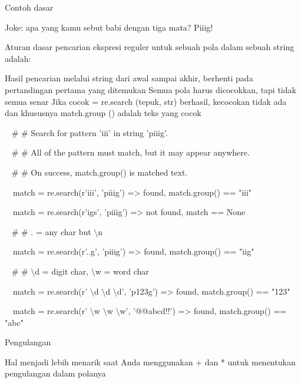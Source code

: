 \noindent 
Contoh dasar \par
\noindent 
Joke: apa yang kamu sebut babi dengan tiga mata? Piiig! \par
\vspace{12pt}
\noindent 
Aturan dasar pencarian ekspresi reguler untuk sebuah pola dalam sebuah string adalah: \par
\noindent 
Hasil pencarian melalui string dari awal sampai akhir, berhenti pada pertandingan pertama yang ditemukan  Semua pola harus dicocokkan, tapi tidak semua senar Jika cocok = re.search (tepuk, str) berhasil, kecocokan tidak ada dan khususnya match.group () adalah teks yang cocok \par
\vspace{12pt}
\noindent 
~  $  \#  $ $  \#  $ Search for pattern 'iii' in string 'piiig'. \par
\noindent 
~  $  \#  $ $  \#  $ All of the pattern must match, but it may appear anywhere. \par
\noindent 
~  $  \#  $ $  \#  $ On success, match.group() is matched text. \par
\noindent 
~~match = re.search(r'iii', 'piiig') =>  found, match.group() == "iii" \par
\noindent 
~~match = re.search(r'igs', 'piiig') =>  not found, match == None \par
\vspace{12pt}
\noindent 
~  $  \#  $ $  \#  $ . = any char but  $  \setminus  $n \par
\noindent 
~~match = re.search(r'..g', 'piiig') =>  found, match.group() == "iig" \par
\vspace{12pt}
\noindent 
~  $  \#  $ $  \#  $  $  \setminus  $d = digit char,  $  \setminus  $w = word char \par
\noindent 
~~match = re.search(r' $  \setminus  $d $  \setminus  $d $  \setminus  $d', 'p123g') =>  found, match.group() == "123" \par
\noindent 
~~match = re.search(r' $  \setminus  $w $  \setminus  $w $  \setminus  $w', '@@abcd!!') =>  found, match.group() == "abc" \par
\vspace{12pt}
\vspace{12pt}
\noindent 
Pengulangan \par
\vspace{12pt}
\noindent 
Hal menjadi lebih menarik saat Anda menggunakan + dan * untuk menentukan pengulangan dalam polanya \par
